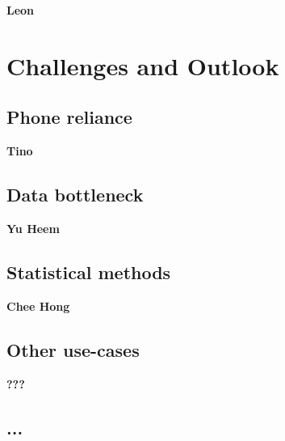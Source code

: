 \documentclass{article}
\begin{document}
\textbf{Leon}

\section{Challenges and Outlook}

\subsection{Phone reliance}

\textbf{Tino}

\subsection{Data bottleneck}

\textbf{Yu Heem}

\subsection{Statistical methods}

\textbf{Chee Hong}

\subsection{Other use-cases}

\textbf{???}

\subsection{...}
\end{document}
